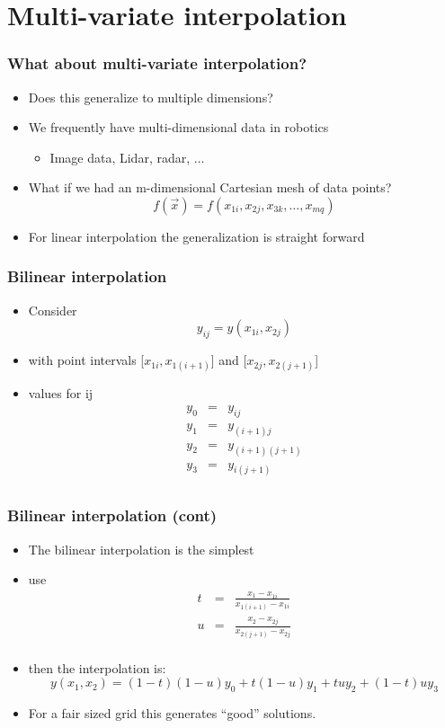 \documentclass[10pt]{beamer}
\begin{document}
\section{Multi-variate interpolation}

\begin{frame}
  \frametitle{What about multi-variate interpolation? }
  \begin{itemize}
  \item Does this generalize to multiple dimensions?
  \item We frequently have multi-dimensional data in robotics
    \begin{itemize}
    \item Image data, Lidar, radar, ...
    \end{itemize}
  \item What if we had an m-dimensional Cartesian mesh of data points?
    \[
      f(\vec{x}) = f(x_{1i}, x_{2j}, x_{3k}, \ldots, x_{mq})
    \]
  \item For linear interpolation the generalization is straight forward
  \end{itemize}
\end{frame}

\begin{frame}
  \frametitle{Bilinear interpolation}
  \begin{itemize}
  \item Consider
    \[ y_{ij} = y(x _{1i}, x_{2j}) \]
  \item with point intervals [$x_{1i}, x_{1(i+1)}$] and  [$x_{2j}, x_{2(j+1)}$]
  \item values for ij
    \[
      \begin{array}{ccc}
        y_0& = & y_{ij}\\
        y_1& = & y_{(i+1)j}\\
        y_2& = & y_{(i+1)(j+1)}\\
        y_3& = & y_{i(j+1)}\\
      \end{array}
    \]
  \end{itemize}
\end{frame}

\begin{frame}
  \frametitle{Bilinear interpolation (cont)}
  \begin{itemize}
  \item The bilinear interpolation is the simplest
  \item use
    \[
      \begin{array}{ccc}
        t & = & \frac{x_1 - x_{1i}}{x_{1(i+1)} - x_{1i}}\\
        u & = & \frac{x_2 - x_{2j}}{x_{2(j+1)} - x_{2j}}\\
      \end{array}
    \]
  \item then the interpolation is:
    \[
      y(x_1, x_2) = (1-t)(1-u) y_0 + t(1-u) y_1 + tu y_2 + (1-t)u y_3
    \]
  \item For a fair sized grid this generates ``good'' solutions.
  \end{itemize}
\end{frame}
\end{document}
